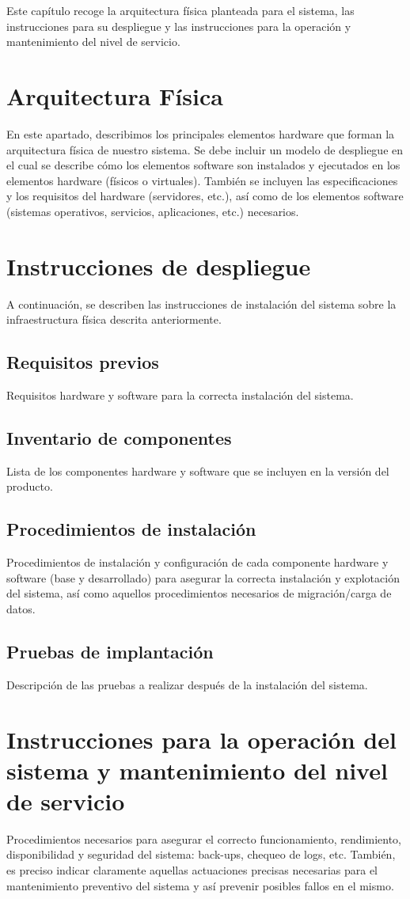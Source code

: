Este capítulo recoge la arquitectura física planteada para el sistema, las instrucciones para su despliegue y las instrucciones para la operación y mantenimiento del nivel de servicio.

\section{Arquitectura Física}
En este apartado, describimos los principales elementos hardware que forman la arquitectura física de nuestro sistema. Se debe incluir un modelo de despliegue en el cual se describe cómo los elementos software son instalados y ejecutados en los elementos hardware (físicos o virtuales). También se incluyen las especificaciones y los requisitos del hardware (servidores, etc.), así como de los elementos software (sistemas operativos, servicios, aplicaciones, etc.) necesarios.

\section{Instrucciones de despliegue}
A continuación, se describen las instrucciones de instalación del sistema sobre la infraestructura física descrita anteriormente.

\subsection{Requisitos previos}
Requisitos hardware y software para la correcta instalación del sistema.

\subsection{Inventario de componentes}
Lista de los componentes hardware y software que se incluyen en la versión del producto.

\subsection{Procedimientos de instalación}
Procedimientos de instalación y configuración de cada componente hardware y software (base y desarrollado) para asegurar la correcta instalación y explotación del sistema, así como aquellos procedimientos necesarios de migración/carga de datos.

\subsection{Pruebas de implantación}
Descripción de las pruebas a realizar después de la instalación del sistema. 

\section{Instrucciones para la operación del sistema y mantenimiento del nivel de servicio}
Procedimientos necesarios para asegurar el correcto funcionamiento, rendimiento, disponibilidad y seguridad del sistema: back-ups, chequeo de logs, etc. También, es preciso indicar claramente aquellas actuaciones precisas necesarias para el mantenimiento preventivo del sistema y así prevenir posibles fallos en el mismo. 